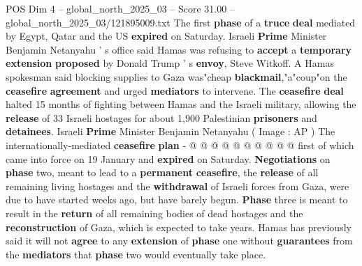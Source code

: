 \begin{textsample}{POS Dim 4 – global\_north\_2025\_03 – Score 31.00 – global\_north\_2025\_03/121895009.txt}
The first \textbf{phase} of a \textbf{truce} \textbf{deal} mediated by Egypt, Qatar and the US \textbf{expired} on Saturday.
Israeli \textbf{Prime} Minister Benjamin Netanyahu ' s office said Hamas was refusing to \textbf{accept} a \textbf{temporary} \textbf{extension} \textbf{proposed} by Donald Trump ' s \textbf{envoy}, Steve Witkoff.
A Hamas spokesman said blocking supplies to Gaza was"cheap \textbf{blackmail},"a"coup"on the \textbf{ceasefire} \textbf{agreement} and urged \textbf{mediators} to intervene.
The \textbf{ceasefire} \textbf{deal} halted 15 months of fighting between Hamas and the Israeli military, allowing the \textbf{release} of 33 Israeli hostages for about 1,900 Palestinian \textbf{prisoners} and \textbf{detainees}.
Israeli \textbf{Prime} Minister Benjamin Netanyahu ( Image : AP ) The internationally-mediated \textbf{ceasefire} \textbf{plan} - @ @ @ @ @ @ @ @ @ @ first of which came into force on 19 January and \textbf{expired} on Saturday. \textbf{Negotiations} on \textbf{phase} two, meant to lead to a \textbf{permanent} \textbf{ceasefire}, the \textbf{release} of all remaining living hostages and the \textbf{withdrawal} of Israeli forces from Gaza, were due to have started weeks ago, but have barely begun. \textbf{Phase} three is meant to result in the \textbf{return} of all remaining bodies of dead hostages and the \textbf{reconstruction} of Gaza, which is expected to take years.
Hamas has previously said it will not \textbf{agree} to any \textbf{extension} of \textbf{phase} one without \textbf{guarantees} from the \textbf{mediators} that \textbf{phase} two would eventually take place.

\end{textsample}
